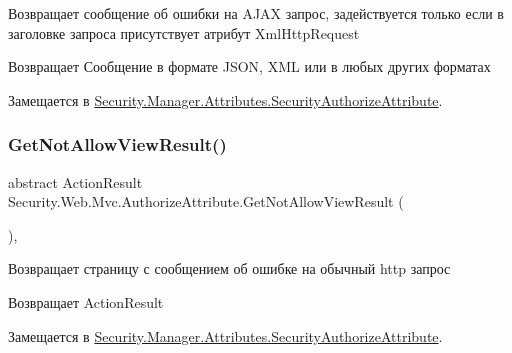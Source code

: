 Возвращает сообщение об ошибки на A\+J\+AX запрос, задействуется только если в заголовке запроса присутствует атрибут Xml\+Http\+Request 

\begin{DoxyReturn}{Возвращает}
Сообщение в формате J\+S\+ON, X\+ML или в любых других форматах
\end{DoxyReturn}


Замещается в \hyperlink{class_security_1_1_manager_1_1_attributes_1_1_security_authorize_attribute_a714bab2b66d43e8266323741eb6c9853}{Security.\+Manager.\+Attributes.\+Security\+Authorize\+Attribute}.

\mbox{\label{class_security_1_1_web_1_1_mvc_1_1_authorize_attribute_a43392ad3d231ebb4f2e6aff6fe177029}} 
\subsubsection{\texorpdfstring{Get\+Not\+Allow\+View\+Result()}{GetNotAllowViewResult()}}
{\footnotesize\ttfamily abstract Action\+Result Security.\+Web.\+Mvc.\+Authorize\+Attribute.\+Get\+Not\+Allow\+View\+Result (\begin{DoxyParamCaption}{ }\end{DoxyParamCaption})\hspace{0.3cm}{\ttfamily [protected]}, {}}



Возвращает страницу с сообщением об ошибке на обычный http запрос 

\begin{DoxyReturn}{Возвращает}
Action\+Result
\end{DoxyReturn}


Замещается в \hyperlink{class_security_1_1_manager_1_1_attributes_1_1_security_authorize_attribute_a49eb91d14a4298c341d6afd66a5848ff}{Security.\+Manager.\+Attributes.\+Security\+Authorize\+Attribute}.

\mbox{\label{class_security_1_1_web_1_1_mvc_1_1_authorize_attribute_a78be6f5f0073324063ec70c0e850d61c}} 
